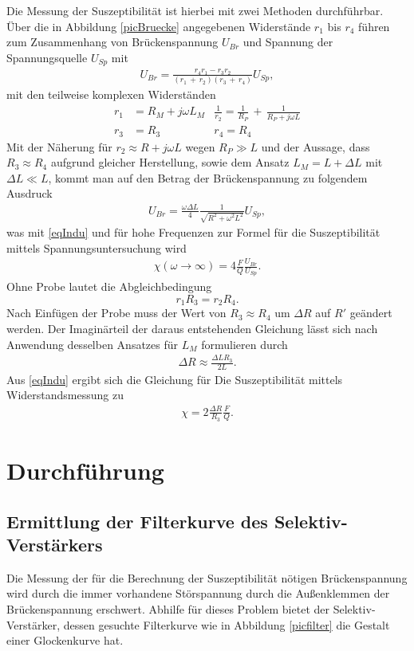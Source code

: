 Die Messung der Suszeptibilität ist hierbei mit zwei Methoden durchführbar. Über die in Abbildung \ref{picBruecke} angegebenen Widerstände
$r_1$ bis $r_4$ führen zum Zusammenhang von Brückenspannung $U_{Br}$ und Spannung der Spannungsquelle $U_{Sp}$ mit
\begin{align}
 U_{Br} = \frac{r_4 r_1 - r_3 r_2}{(r_1 \, + \, r_2)(r_3 \, + \, r_4)} U_{Sp},
\end{align}
mit den teilweise komplexen Widerständen
\begin{align*}
 r_1 &= R_M + j\omega L_M &\frac{1}{r_2} = \frac{1}{R_P}\,+\, \frac{1}{R_P + j \omega L}\\
 r_3 &= R_3	&r_4 = R_4
\end{align*}
Mit der Näherung für $r_2 \approx R  + j\omega L$ wegen $R_P \gg L$ und der Aussage, dass $R_3 \approx R_4$ aufgrund gleicher Herstellung,
sowie dem Ansatz $L_M = L + \Delta L$ mit $\Delta L \ll L$, kommt man auf den Betrag der Brückenspannung zu folgendem Ausdruck
\begin{align}
 U_{Br} = \frac{\omega \Delta L}{4} \frac{1}{\sqrt{R^2+\omega^2L^2}} U_{Sp},
\end{align}
was mit \eqref{eqIndu} und für hohe Frequenzen zur Formel für die Suszeptibilität mittels Spannungsuntersuchung wird
\begin{align}
 \chi(\omega \to \infty) = 4 \frac{F}{Q} \frac{U_{Br}}{U_{Sp}}.
\end{align}
Ohne Probe lautet die Abgleichbedingung 
\begin{equation}
 r_1 R_3 = r_2 R_4.
\end{equation}
Nach Einfügen der Probe muss der Wert von $R_3 \approx R_4$ um $\Delta R$ auf $R'$ geändert werden. Der Imaginärteil der daraus entstehenden
Gleichung lässt sich nach Anwendung desselben Ansatzes für $L_M$ formulieren durch
\begin{align}
 \Delta R \approx \frac{\Delta L R_3}{2L}.
\end{align}
Aus \eqref{eqIndu} ergibt sich die Gleichung für Die Suszeptibilität mittels Widerstandsmessung zu
\begin{align}
 \chi = 2 \frac{\Delta R}{R_3} \frac{F}{Q}.
 \label{eq_chi_rechnung}
\end{align}

\section{Durchführung}
\subsection{Ermittlung der Filterkurve des Selektiv-Verstärkers}
Die Messung der für die Berechnung der Suszeptibilität nötigen Brückenspannung wird durch die immer vorhandene Störspannung durch
die Außenklemmen der Brückenspannung erschwert. Abhilfe für dieses Problem bietet der Selektiv-Verstärker, dessen gesuchte Filterkurve
wie in Abbildung \ref{picfilter} die Gestalt einer Glockenkurve hat. 

